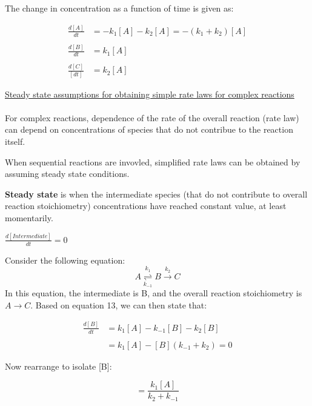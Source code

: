 \documentclass[12pt, letterpaper]{article}
\begin{document}
    The change in concentration as a function of time is given as: 

    \begin{align*}
        \frac{d[A]}{dt} &= -k_1[A] - k_2[A] = -(k_1 + k_2)[A] \\ \\
        \frac{d[B]}{dt} &= k_1[A] \\ \\
        \frac{d[C]}{[dt]} &= k_2[A]  
    \end{align*}

    \underline{Steady state assumptions for obtaining simple rate laws for complex reactions} \\ \\
    For complex reactions, dependence of the rate of the overall reaction (rate law) can depend on concentrations
    of species that do not contribue to the reaction itself.

    When sequential reactions are invovled, simplified rate laws can be obtained by assuming steady state conditions. 

    \textbf{Steady state} is when the intermediate species (that do not contribute to overall reaction stoichiometry) concentrations have reached
    constant value, at least momentarily.

    \begin{center}
        \( \frac{d[Intermediate]}{dt} = 0 \)
    \end{center}

    Consider the following equation: 
    \begin{equation}
        A \stackrel{k_1}{\underset{k_{-1}}{\rightleftharpoons}} B \stackrel{k_2} \longrightarrow C
    \end{equation}
    In this equation, the intermediate is B, and the overall reaction stoichiometry is \(A \longrightarrow C \).
    Based on equation 13, we can then state that: 

    \begin{align*}
        \frac{d[B]}{dt} &= k_1[A] - k_{-1}[B] - k_2[B] \\ \\
        &= k_1[A] - [B](k_{-1} + k_2) = 0
    \end{align*}

    Now rearrange to isolate [B]: 

    \begin{equation}
        [B] = \frac{k_1[A]}{k_2 + k_{-1}} 
    \end{equation}
\end{document}
